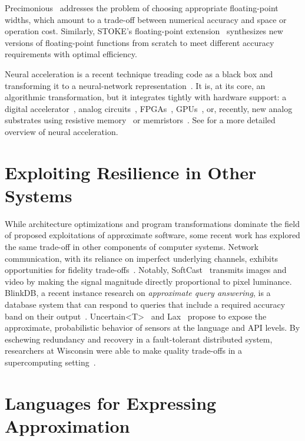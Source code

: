 Precimonious~\cite{precimonious} addresses the problem of choosing appropriate
floating-point widths, which amount to a trade-off between numerical accuracy
and space or operation cost.
Similarly, STOKE's floating-point extension~\cite{stoke-fp} synthesizes new
versions of floating-point functions from scratch to meet different accuracy
requirements with optimal efficiency.

Neural acceleration is a recent technique treading code as a black box and
transforming it to a neural-network representation~\cite{npu, emeuro, benchnn,
temam-isca}.
It is, at its core, an algorithmic transformation, but it integrates tightly
with hardware support: a digital accelerator~\cite{npu}, analog
circuits~\cite{anpu}, FPGAs~\cite{snnap},
GPUs~\cite{neuralgpu}, or, recently, new analog substrates using
resistive memory~\cite{rram-npu} or memristors~\cite{memristor-npu}.
See  for a more detailed overview of neural acceleration.


\section{Exploiting Resilience in Other Systems}

While architecture optimizations and program transformations dominate the
field of proposed exploitations of approximate software, some recent work has
explored the same trade-off in other components of computer systems. Network
communication, with its reliance on imperfect underlying channels, exhibits
opportunities for fidelity trade-offs~\cite{softcast, luo-globecom, apex,
smpmup2006}. Notably, SoftCast~\cite{softcast} transmits images and video by
making the signal magnitude directly proportional to pixel luminance. BlinkDB,
a recent instance research on \emph{approximate query answering},
is a database system that can respond to queries that include a required
accuracy band on their output~\cite{blinkdb}.
Uncertain{\textless}T{\textgreater}~\cite{uncertaint} and Lax~\cite{lax}
propose to expose the approximate, probabilistic behavior of sensors at the
language and API levels.
By eschewing redundancy and
recovery in a fault-tolerant distributed system, researchers at Wisconsin were
able to make quality trade-offs in a supercomputing
setting~\cite{dekruijf-icpp}.


\section{Languages for Expressing Approximation}

